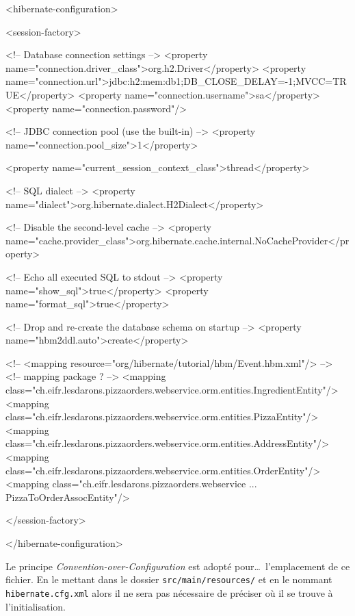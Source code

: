 \begin{xmlcode}
<hibernate-configuration>

    <session-factory>

        <!-- Database connection settings -->
        <property name="connection.driver_class">org.h2.Driver</property>
        <property name="connection.url">jdbc:h2:mem:db1;DB_CLOSE_DELAY=-1;MVCC=TRUE</property>
        <property name="connection.username">sa</property>
        <property name="connection.password"/>

        <!-- JDBC connection pool (use the built-in) -->
        <property name="connection.pool_size">1</property>

        <property name="current_session_context_class">thread</property>

        <!-- SQL dialect -->
        <property name="dialect">org.hibernate.dialect.H2Dialect</property>

        <!-- Disable the second-level cache  -->
        <property name="cache.provider_class">org.hibernate.cache.internal.NoCacheProvider</property>

        <!-- Echo all executed SQL to stdout -->
        <property name="show_sql">true</property>
        <property name="format_sql">true</property>

        <!-- Drop and re-create the database schema on startup -->
        <property name="hbm2ddl.auto">create</property>

        <!--
        <mapping resource="org/hibernate/tutorial/hbm/Event.hbm.xml"/>
        -->
        <!-- mapping package ? -->
        <mapping class="ch.eifr.lesdarons.pizzaorders.webservice.orm.entities.IngredientEntity"/>
        <mapping class="ch.eifr.lesdarons.pizzaorders.webservice.orm.entities.PizzaEntity"/>
        <mapping class="ch.eifr.lesdarons.pizzaorders.webservice.orm.entities.AddressEntity"/>
        <mapping class="ch.eifr.lesdarons.pizzaorders.webservice.orm.entities.OrderEntity"/>
        <mapping class="ch.eifr.lesdarons.pizzaorders.webservice ... PizzaToOrderAssocEntity"/>

    </session-factory>

</hibernate-configuration>
\end{xmlcode}

Le principe \emph{Convention-over-Configuration} est adopté pour\dots~l'emplacement de ce fichier.
En le mettant dans le dossier \verb|src/main/resources/| et en le nommant \verb|hibernate.cfg.xml|
alors il ne sera pas nécessaire de préciser où il se trouve à l'initialisation.

